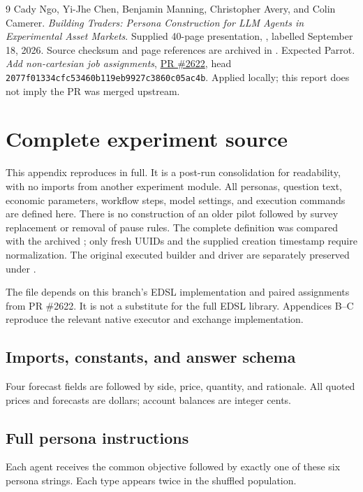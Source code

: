 \documentclass[11pt,letterpaper]{article}
\newcommand{\code}[1]{\texttt{\small #1}}
\begin{document}
\begin{thebibliography}{9}\small
{} Cady Ngo, Yi-Jhe Chen, Benjamin Manning, Christopher Avery, and
Colin Camerer. \emph{Building Traders: Persona Construction for LLM Agents in
Experimental Asset Markets}. Supplied 40-page presentation, ,
labelled September 18, 2026. Source checksum and page references are archived
in .
 Expected Parrot. \emph{Add non-cartesian job assignments},
\href{https://github.com/expectedparrot/edsl/pull/2622}{PR \#2622}, head
\code{2077f01334cfc53460b119eb9927c3860c05ac4b}. Applied locally; this report
does not imply the PR was merged upstream.
\end{thebibliography}

\clearpage
\appendix
\section{Complete experiment source}\label{app:experiment}
This appendix reproduces  in full.
It is a post-run consolidation for readability, with no imports from another
experiment module. All personas, question text, economic parameters, workflow
steps, model settings, and execution commands are defined here. There is no
construction of an older pilot followed by survey replacement or removal of
pause rules. The complete definition was compared with the archived
; only fresh UUIDs and the supplied creation timestamp
require normalization. The original executed builder and driver are separately
preserved under .

The file depends on this branch's EDSL implementation and paired assignments
from PR \#2622. It is not a substitute for the full EDSL library. Appendices
B--C reproduce the relevant native executor and exchange implementation.

\subsection{Imports, constants, and answer schema}
Four forecast fields are followed by side, price, quantity, and rationale.
All quoted prices and forecasts are dollars; account balances are integer cents.
\CodeSetup

\subsection{Full persona instructions}
Each agent receives the common objective followed by exactly one of these
six persona strings. Each type appears twice in the shuffled population.
\CodePersonas
\end{document}
